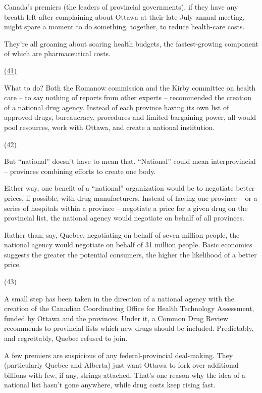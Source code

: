 
\qquad Canada's premiers (the leaders of provincial governments), if they have any breath left after complaining about Ottawa at their late July annual meeting, might spare a moment to do something, together, to reduce health-care costs.

\qquad They're all groaning about soaring health budgets, the fastest-growing component of which are pharmaceutical costs.

\qquad \ul{(41) \qquad\qquad\qquad\qquad}

\qquad What to do? Both the Romanow commission and the Kirby committee on health care -- to say nothing of reports from other experts -- recommended the creation of a national drug agency. Instead of each province having its own list of approved drugs, bureaucracy, procedures and limited bargaining power, all would pool resources, work with Ottawa, and create a national institution.

\qquad \ul{(42) \qquad\qquad\qquad\qquad}

\qquad But ``national'' doesn't have to mean that. ``National'' could mean interprovincial -- provinces combining efforts to create one body.

\qquad Either way, one benefit of a ``national'' organization would be to negotiate better prices, if possible, with drug manufacturers. Instead of having one province -- or a series of hospitals within a province -- negotiate a price for a given drug on the provincial list, the national agency would negotiate on behalf of all provinces.

\qquad Rather than, say, Quebec, negotiating on behalf of seven million people, the national agency would negotiate on behalf of 31 million people. Basic economics suggests the greater the potential consumers, the higher the likelihood of a better price.

\qquad \ul{(43) \qquad\qquad\qquad\qquad}

\qquad A small step has been taken in the direction of a national agency with the creation of the Canadian Coordinating Office for Health Technology Assessment, funded by Ottawa and the provinces. Under it, a Common Drug Review recommends to provincial lists which new drugs should be included. Predictably, and regrettably, Quebec refused to join.

\qquad A few premiers are suspicious of any federal-provincial deal-making. They (particularly Quebec and Alberta) just want Ottawa to fork over additional billions with few, if any, strings attached. That's one reason why the idea of a national list hasn't gone anywhere, while drug costs keep rising fast.

